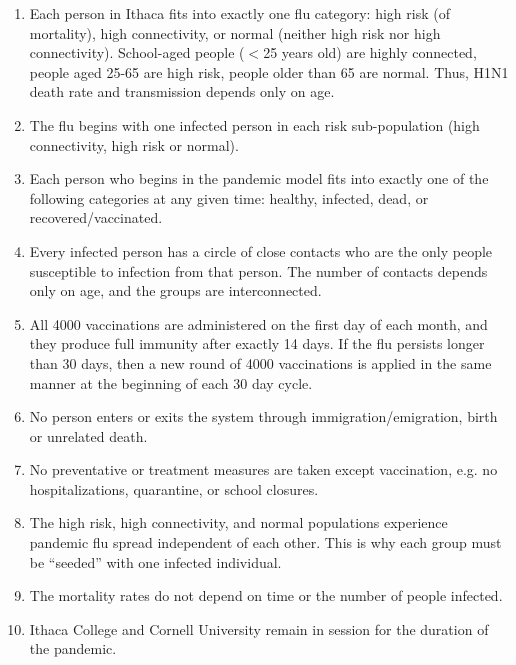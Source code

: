 \documentclass[titlepage]{article}
\begin{document}
\begin{enumerate}
\item Each person in Ithaca fits into exactly one flu category: high risk (of mortality), high connectivity, or normal (neither high risk nor high connectivity). School-aged people ($<$25 years old) are highly connected, people aged 25-65 are high risk, people older than 65 are normal. Thus, H1N1 death rate and transmission depends only on age.

\item The flu begins with one infected person in each risk sub-population (high connectivity, high risk or normal).

\item  Each person who begins in the pandemic model fits into exactly one of the following categories at any given time: healthy, infected, dead, or recovered/vaccinated.

\item Every infected person has a circle of close contacts who are the only people susceptible to infection from that person. The number of contacts depends only on age, and the groups are interconnected.

\item All 4000 vaccinations are administered on the first day of each month, and they produce full immunity after exactly 14 days. If the flu persists longer than 30 days, then a new round of 4000 vaccinations is applied in the same manner at the beginning of each 30 day cycle.

\item No person enters or exits the system through immigration/emigration, birth or unrelated death.

\item  No preventative or treatment measures are taken except vaccination, e.g. no hospitalizations, quarantine, or school closures.

\item The high risk, high connectivity, and normal populations experience pandemic flu spread independent of each other. This is why each group must be ``seeded'' with one infected individual.

\item The mortality rates do not depend on time or the number of people infected.


\item Ithaca College and Cornell University remain in session for the duration of the pandemic.
\end{enumerate}
\end{document}
